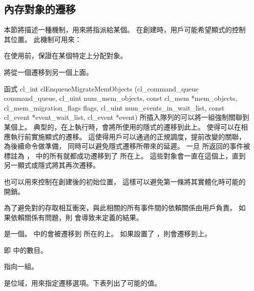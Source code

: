 \subsection{內存對象的遷移}

本節將描述一種機制，用來將指派給某個。
在創建時，用戶可能希望顯式的控制其位置。
此機制可用來：
\startigBase
\item 在使用前，保證在某個特定上分配對象。

\item 將從一個遷移到另一個上面。
\stopigBase

函式
\startclc
cl_int clEnqueueMigrateMemObjects (cl_command_queue command_queue,
			cl_uint num_mem_objects,
			const cl_mem *mem_objects,
			cl_mem_migration_flags flags,
			cl_uint num_events_in_wait_list,
			const cl_event *event_wait_list,
			cl_event *event)
\stopclc
所插入隊列的可以將一組強制關聯到某個上。
典型的，在上執行時，會將所使用的隱式的遷移到此上。
 使得可以在相應執行前實施顯式的遷移。
這使得用戶可以通過的正規調度，提前改變的關聯，為後續命令做準備，
同時可以避免隱式遷移所帶來的延遲。
一旦  所返回的事件被標註為 ，
  中的所有就都成功遷移到了  所在上。
這些對象會一直在這個上，直到另一顯式或隱式將其再次遷移。

 也可以用來控制在創建後的初始位置，
這樣可以避免第一條將其實體化時可能的開銷。

為了避免對的存取相互衝突，與此相關的所有事件間的依賴關係由用戶負責。
如果依賴關係有問題，則  會導致未定義的結果。

 是一個。
  中的會被遷移到  所在的上。
如果設置了 ，則會遷移到上。

 即  中的數目。

 指向一組。

 是位域，用來指定遷移選項。下表列出了可能的值。

{}

